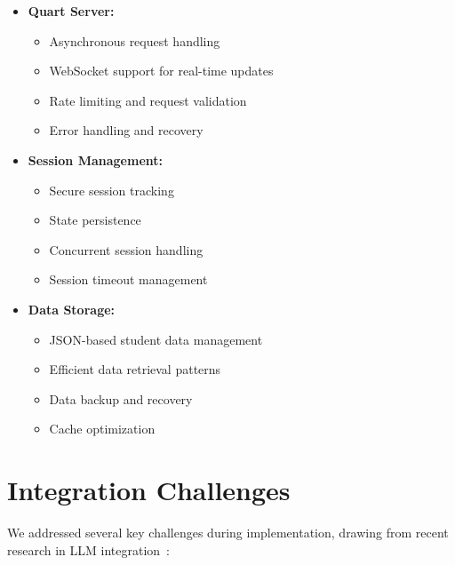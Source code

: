 \begin{itemize}
  \item \textbf{Quart Server:} 
    \begin{itemize}
      \item Asynchronous request handling
      \item WebSocket support for real-time updates
      \item Rate limiting and request validation
      \item Error handling and recovery
    \end{itemize}
  
  \item \textbf{Session Management:} 
    \begin{itemize}
      \item Secure session tracking
      \item State persistence
      \item Concurrent session handling
      \item Session timeout management
    \end{itemize}
  
  \item \textbf{Data Storage:} 
    \begin{itemize}
      \item JSON-based student data management
      \item Efficient data retrieval patterns
      \item Data backup and recovery
      \item Cache optimization
    \end{itemize}
\end{itemize}

\section{Integration Challenges}
\label{sec:challenges}

We addressed several key challenges during implementation, drawing from recent research in LLM integration~\cite{huang2024survey}:

